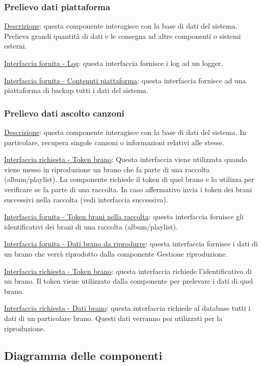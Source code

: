 \documentclass[a4paper,12pt]{article}
\begin{document}
\subsubsection{Prelievo dati piattaforma}

\underline{Descrizione}: questa componente interagisce con la base di dati del sistema. Prelieva grandi quantità di dati e le consegna ad altre componenti o sistemi esterni.

\underline{Interfaccia fornita - Log}: questa interfaccia fornisce i log ad un logger.

\underline{Interfaccia fornita - Contenuti piattaforma}: questa interfaccia fornisce ad una piattaforma di backup tutti i dati del sistema.

\subsubsection{Prelievo dati ascolto canzoni}

\underline{Descrizione}: questa componente interagisce con la base di dati del sistema. In particolare, recupera singole canzoni o informazioni relativi alle stesse.

\underline{Interfaccia richiesta - Token brano}: Questa interfaccia viene utilizzata quando viene messo in riproduzione un brano che fa parte di una raccolta (album/playlist). La componente richiede il token di quel brano e lo utilizza per verificare se fa parte di una raccolta. In caso affermativo invia i token dei brani successivi nella raccolta (vedi interfaccia successiva).

\underline{Interfaccia fornita - Token brani nella raccolta}: questa interfaccia fornisce gli identificativi dei brani di una raccolta (album/playlist).

\underline{Interfaccia fornita - Dati brano da riprodurre}: questa interfaccia fornisce i dati di un brano che verrà riprodotto dalla componente Gestione riproduzione.

\underline{Interfaccia richiesta - Token brano}: questa interfaccia richiede l’identificativo di un brano. Il token viene utilizzato dalla componente per prelevare i dati di quel brano.

\underline{Interfaccia richiesta - Dati brano}: questa interfaccia richiede al database tutti i dati di un particolare brano. Questi dati verranno poi utilizzati per la riproduzione.

\subsection{Diagramma delle componenti}
\end{document}
